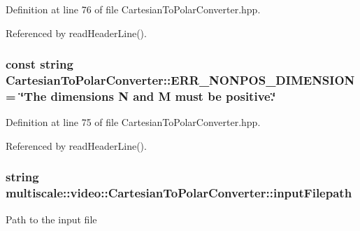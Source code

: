 \-Definition at line 76 of file \-Cartesian\-To\-Polar\-Converter.\-hpp.



\-Referenced by read\-Header\-Line().

\hypertarget{classmultiscale_1_1video_1_1CartesianToPolarConverter_ab3a2114f4dd2615abba3305609f1b616}{
\subsubsection[{\-E\-R\-R\-\_\-\-N\-O\-N\-P\-O\-S\-\_\-\-D\-I\-M\-E\-N\-S\-I\-O\-N}]{\setlength{\rightskip}{0pt plus 5cm}const string {\bf \-Cartesian\-To\-Polar\-Converter\-::\-E\-R\-R\-\_\-\-N\-O\-N\-P\-O\-S\-\_\-\-D\-I\-M\-E\-N\-S\-I\-O\-N} = \char`\"{}\-The dimensions \-N and \-M must be positive.\char`\"{}}}\label{classmultiscale_1_1video_1_1CartesianToPolarConverter_ab3a2114f4dd2615abba3305609f1b616}


\-Definition at line 75 of file \-Cartesian\-To\-Polar\-Converter.\-hpp.



\-Referenced by read\-Header\-Line().

\hypertarget{classmultiscale_1_1video_1_1CartesianToPolarConverter_aa15eca9e8d3da0eb8ff1b6583e392f05}{
\subsubsection[{input\-Filepath}]{\setlength{\rightskip}{0pt plus 5cm}string {\bf multiscale\-::video\-::\-Cartesian\-To\-Polar\-Converter\-::input\-Filepath}}}\label{classmultiscale_1_1video_1_1CartesianToPolarConverter_aa15eca9e8d3da0eb8ff1b6583e392f05}
\-Path to the input file 

